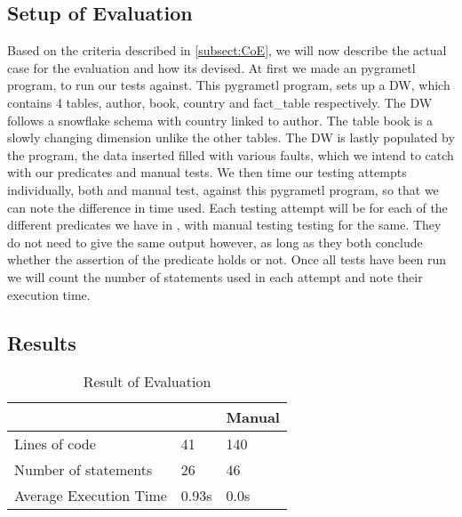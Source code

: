 \subsection{Setup of Evaluation}
Based on the criteria described in \cref{subsect:CoE}, we will now describe the actual case for the evaluation and how its devised. At first we made an pygrametl program, to run our tests against. This pygrametl program, sets up a DW, which contains 4 tables, author, book, country and fact\_table respectively. The DW follows a snowflake schema with country linked to author. The table book is a slowly changing dimension unlike the other tables.
The DW is lastly populated by the program, the data inserted filled with various faults, which we intend to catch with our predicates and manual tests.
We then time our testing attempts individually, both \FW{} and manual test, against this pygrametl program, so that we can note the difference in time used. Each testing attempt will be for each of the different predicates we have in \FW{}, with manual testing testing for the same. They do not need to give the same output however, as long as they both conclude whether the assertion of the predicate holds or not. Once all tests have been run we will count the number of statements used in each attempt and note their execution time.


\subsection{Results}

\begin{table}[h]
\centering
\caption{Result of Evaluation}
\label{table:result}
\begin{tabular}{|p{}|p{}|p{}|}
\hline
												& \FW{}	 	& Manual				  \\ \hline
Lines of code					 	& 41      & 140          		\\ \hline
Number of statements   	& 26      & 46             	\\ \hline
Average Execution Time	& 0.93s   & 0.0s           	\\ \hline
\end{tabular}
\end{table}








